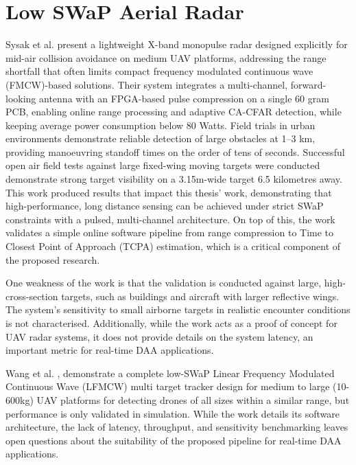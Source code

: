 \section{Low SWaP Aerial Radar}
Sysak et al. \cite{sysak2025_lightweight_compact_pulse_radar_uav_collision_avoidance} present a lightweight X-band monopulse radar designed explicitly for mid-air collision avoidance on medium UAV platforms, addressing the range shortfall that often limits compact frequency modulated continuous wave (FMCW)-based solutions. Their system integrates a multi-channel, forward-looking antenna with an FPGA-based pulse compression on a single 60 gram PCB, enabling online range processing and adaptive CA-CFAR detection, while keeping average power consumption below 80 Watts. Field trials in urban environments demonstrate reliable detection of large obstacles at 1–3 km, providing manoeuvring standoff times on the order of tens of seconds. Successful open air field tests against large fixed-wing moving targets were conducted demonstrate strong target visibility on a 3.15m-wide target 6.5 kilometres away. This work produced results that impact this thesis' work, demonstrating that high-performance, long distance sensing can be achieved under strict SWaP constraints with a pulsed, multi-channel architecture. On top of this, the work validates a simple online software pipeline from range compression to Time to Closest Point of Approach (TCPA) estimation, which is a critical component of the proposed research. 

One weakness of the work is that the validation is conducted against large, high-cross-section targets, such as buildings and aircraft with larger reflective wings. The system's sensitivity to small airborne targets in realistic encounter conditions is not characterised. Additionally, while the work acts as a proof of concept for UAV radar systems, it does not provide details on the system latency, an important metric for real-time DAA applications. 

Wang et al. \cite{Wang2016}, demonstrate a complete low-SWaP Linear Frequency Modulated Continuous Wave (LFMCW) multi target tracker design for medium to large (10-600kg) UAV platforms for detecting drones of all sizes within a similar range, but performance is only validated in simulation. While the work details its software architecture, the lack of latency, throughput, and sensitivity benchmarking leaves open questions about the suitability of the proposed pipeline for real-time DAA applications. 


